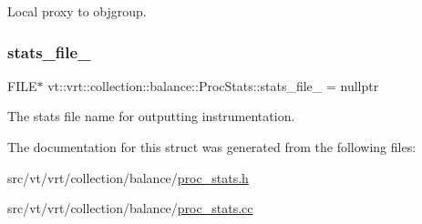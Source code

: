 Local proxy to objgroup. 

\mbox{\label{structvt_1_1vrt_1_1collection_1_1balance_1_1_proc_stats_a7c1a0cd0d083053cc4670873bc4f6ef1}} 
\subsubsection{\texorpdfstring{stats\+\_\+file\+\_\+}{stats\_file\_}}
{\footnotesize\ttfamily F\+I\+LE$\ast$ vt\+::vrt\+::collection\+::balance\+::\+Proc\+Stats\+::stats\+\_\+file\+\_\+ = nullptr\hspace{0.3cm}{\ttfamily [private]}}



The stats file name for outputting instrumentation. 



The documentation for this struct was generated from the following files\+:\begin{DoxyCompactItemize}
\item 
src/vt/vrt/collection/balance/\hyperlink{proc__stats_8h}{proc\+\_\+stats.\+h}\item 
src/vt/vrt/collection/balance/\hyperlink{proc__stats_8cc}{proc\+\_\+stats.\+cc}\end{DoxyCompactItemize}
